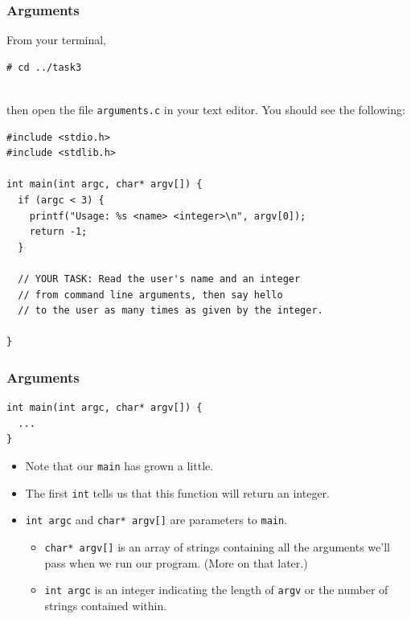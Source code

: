 \documentclass[pdf]{beamer}
\begin{document}
\begin{frame}[fragile]
  \frametitle{Arguments}
  From your terminal,
\begin{verbatim}
# cd ../task3
\end{verbatim}
\\
  then open the file \texttt{arguments.c} in your text editor. You
  should see the following:
  \pause
\begin{verbatim}
#include <stdio.h>
#include <stdlib.h>

int main(int argc, char* argv[]) {
  if (argc < 3) {
    printf("Usage: %s <name> <integer>\n", argv[0]);
    return -1;
  }

  // YOUR TASK: Read the user's name and an integer
  // from command line arguments, then say hello
  // to the user as many times as given by the integer.

}
\end{verbatim}

\end{frame}

\begin{frame}[fragile]
  \frametitle{Arguments}

\begin{verbatim}
int main(int argc, char* argv[]) {
  ...
}
\end{verbatim}

  \begin{itemize}
  \item Note that our \texttt{main} has grown a little.
    \pause
  \item The first \texttt{int} tells us that this function will return
    an integer.
    \pause
  \item \texttt{int argc} and \texttt{char* argv[]} are
    parameters to \texttt{main}.
    \pause
    \begin{itemize}
    \item \texttt{char* argv[]} is an array of strings containing all the
      arguments we'll pass when we run our program. (More on that later.)
      \pause
    \item \texttt{int argc} is an integer indicating the length of
      \texttt{argv} or the number of strings contained within.
    \end{itemize}
  \end{itemize}
\end{frame}
\end{document}
